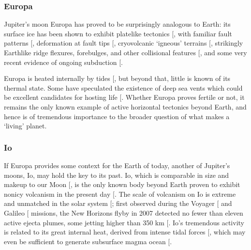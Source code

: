 \documentclass[letterpaper,10pt,english]{jupyterBook}
\begin{document}
\subsubsection{Europa}
\label{\detokenize{content/chapter_01_background/main:europa}}
\sphinxAtStartPar
Jupiter’s moon Europa has proved to be surprisingly analogous to Earth: its surface ice has been shown to exhibit plate\sphinxhyphen{}like tectonics {[}\sphinxcite{references:id549}{]}, with familiar fault patterns {[}\sphinxcite{references:id617}{]}, deformation at fault tips {[}\sphinxcite{references:id586}{]}, cryovolcanic ‘igneous’ terrains {[}\sphinxcite{references:id524}{]}, strikingly Earth\sphinxhyphen{}like ridge flexures, forebulges, and other collisional features {[}\sphinxcite{references:id560}{]}, and some very recent evidence of ongoing subduction {[}\sphinxcite{references:id277}{]}.

\sphinxAtStartPar
Europa is heated internally by tides {[}\sphinxcite{references:id583}{]}, but beyond that, little is known of its thermal state. Some have speculated the existence of deep sea vents which could be excellent candidates for hosting life {[}\sphinxcite{references:id555}{]}. Whether Europa proves fertile or not, it remains the only known example of active horizontal tectonics beyond Earth, and hence is of tremendous importance to the broader question of what makes a ‘living’ planet.


\subsubsection{Io}
\label{\detokenize{content/chapter_01_background/main:io}}
\sphinxAtStartPar
If Europa provides some context for the Earth of today, another of Jupiter’s moons, Io, may hold the key to its past. Io, which is comparable in size and makeup to our Moon {[}\sphinxcite{references:id193}{]}, is the only known body beyond Earth proven to exhibit non\sphinxhyphen{}icy volcanism in the present day {[}\sphinxcite{references:id194}{]}. The scale of volcanism on Io is extreme and unmatched in the solar system {[}\sphinxcite{references:id195}{]}; first observed during the Voyager {[}\sphinxcite{references:id191}{]} and Galileo {[}\sphinxcite{references:id187}{]} missions, the New Horizons flyby in 2007 detected no fewer than eleven active ejecta plumes, some jetting higher than 350 km {[}\sphinxcite{references:id196}{]}. Io’s tremendous activity is related to its great internal heat, derived from intense tidal forces {[}\sphinxcite{references:id591}{]}, which may even be sufficient to generate subsurface magma ocean {[}\sphinxcite{references:id190}{]}.
\end{document}
